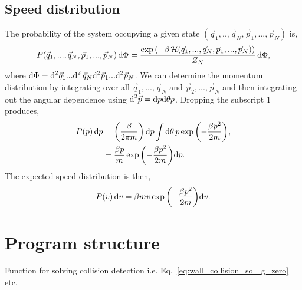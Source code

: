 \documentclass{article}
\newcommand{\diff}{\textnormal{d}}
\begin{document}
\subsection{Speed distribution}
The probability of the system occupying a given state $(\vec{q}_1, .., \vec{q}_N, \vec{p}_1, ..., \vec{p}_N)$ is,
\begin{equation}
    P(\vec{q}_1, ..., \vec{q}_N, \vec{p}_1, ..., \vec{p}_N) \, \diff \Phi
    =
    \frac{\exp{\left(
        - \beta \, \mathcal{H}(\vec{q}_1,..., \vec{q}_N, \vec{p}_1, ..., \vec{p}_N)
    \right)}}{Z_N} \,
    \diff \Phi,
\end{equation}
where $\diff \Phi =\diff^2 \vec{q}_1 ... \diff^2 \, \vec{q}_N  \diff^2 \vec{p}_1 ... \diff^2 \vec{p}_N$. We can determine the momentum distribution by integrating over all $\vec{q}_1,..., \vec{q}_N$ and $\vec{p}_2, ..., \vec{p}_N$ and then integrating out the angular dependence using $\diff^2 \vec{p} = \diff p \diff \theta p$. Dropping the subscript 1 produces,
\begin{align}
    P(p) \, \diff p
    &=
    \left(
        \frac{\beta}{2 \pi m}
    \right) \diff p
    \int \diff \theta \,
    p
    \exp{\left( -\frac{\beta p^2}{2m} \right)}, \\
    &=
    \frac{\beta p}{m}
    \exp{\left( -\frac{\beta p^2}{2m} \right)} \diff p.
\end{align}
The expected speed distribution is then,
\begin{equation}
    P(v) \, \diff v
    =
    \beta m v \exp{\left( -\frac{\beta p^2}{2m} \right)} \diff v.
\end{equation}

\section{Program structure}
Function for solving collision detection i.e. Eq.~\ref{eq:wall_collision_sol_g_zero} etc.
\end{document}
